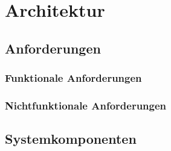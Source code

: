 
\chapter{Architektur}

\section{Anforderungen}
\subsection{Funktionale Anforderungen}
\subsection{Nichtfunktionale Anforderungen}

\section{Systemkomponenten}

